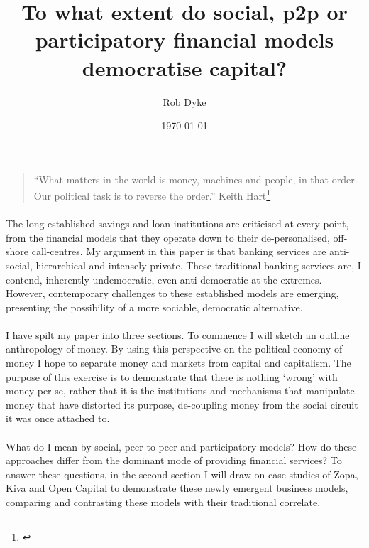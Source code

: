 \documentclass[12pt,a4paper,titlepage]{article}
\title{To what extent do social, p2p or participatory financial models democratise capital?}
\author{Rob Dyke}
\date{\today}
\begin{document}

\maketitle
\tableofcontents
\newpage
\begin{quote}
``What matters in the world is money, machines and people, in that order. Our political task is to reverse the order.'' Keith Hart\footnote{\cite[p. 6]{HartK2005thmd}}
\end{quote}
\doublespacing
\paragraph{}The long established savings and loan institutions are criticised at every point, from the financial models that they operate down to their de-personalised, off-shore call-centres. My argument in this paper is that banking services are anti-social, hierarchical and intensely private. These traditional banking services are, I contend, inherently undemocratic, even anti-democratic at the extremes. However, contemporary challenges to these established models are emerging, presenting the possibility of a more sociable, democratic alternative.

\paragraph{}I have spilt my paper into three sections. To commence I will sketch an outline anthropology of money. By using this perspective on the political economy of money I hope to separate money and markets from capital and capitalism. The purpose of this exercise is to demonstrate that there is nothing `wrong' with money per se, rather that it is the institutions and mechanisms that manipulate money that have distorted its purpose, de-coupling money from the social circuit it was once attached to.

\paragraph{}What do I mean by social, peer-to-peer and participatory models? How do these approaches differ from the dominant mode of providing financial services? To answer these questions, in the second section  I will draw on case studies of Zopa, Kiva and Open Capital to demonstrate these newly emergent business models, comparing and contrasting these models with their traditional correlate.
\end{document}
